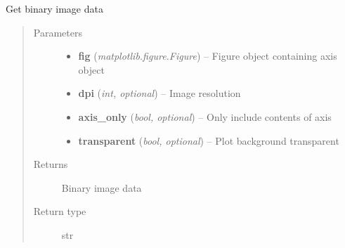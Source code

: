 \documentclass[letterpaper,10pt,english]{sphinxmanual}
\begin{document}
\begin{fulllineitems}
\label{segmentation:flamingo.segmentation.plot.get_image_data}
Get binary image data
\begin{quote}\begin{description}
\item[{Parameters}] \leavevmode\begin{itemize}
\item {} 
\textbf{fig} (\emph{matplotlib.figure.Figure}) -- Figure object containing axis object

\item {} 
\textbf{dpi} (\emph{int, optional}) -- Image resolution

\item {} 
\textbf{axis\_only} (\emph{bool, optional}) -- Only include contents of axis

\item {} 
\textbf{transparent} (\emph{bool, optional}) -- Plot background transparent

\end{itemize}

\item[{Returns}] \leavevmode
Binary image data

\item[{Return type}] \leavevmode
str

\end{description}\end{quote}

\end{fulllineitems}

\end{document}
